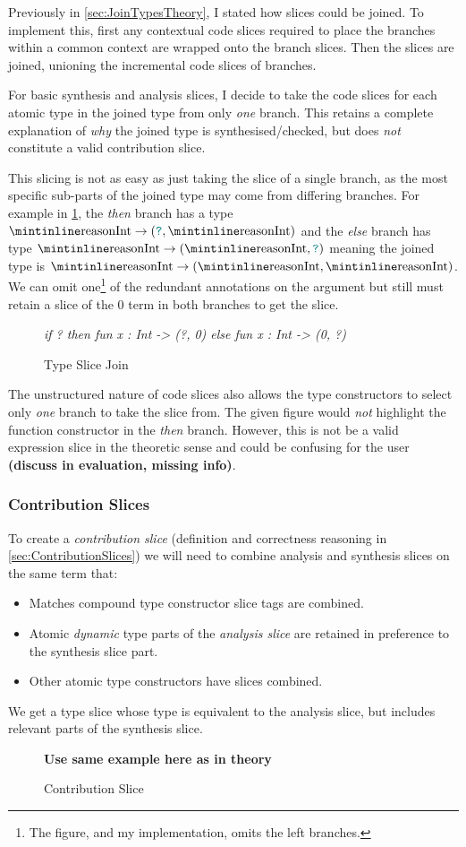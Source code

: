 Previously in \cref{sec:JoinTypesTheory}, I stated how slices could be joined. To implement this, first any contextual code slices required to place the branches within a common context are wrapped onto the branch slices. Then the slices are joined, unioning the incremental code slices of branches.

For basic synthesis and analysis slices, I decide to take the code slices for each atomic type in the joined type from only \textit{one} branch. This retains a complete explanation of \textit{why} the joined type is synthesised/checked, but does \textit{not} constitute a valid contribution slice.

This slicing is not as easy as just taking the slice of a single branch, as the most specific sub-parts of the joined type may come from differing branches. For example in \cref{fig:TypeSliceJoinExample}, the \textit{then} branch has a type $\code{Int} \to (\dyn,\code{Int})$ and the \textit{else} branch has type $\code{Int} \to (\code{Int}, \dyn)$ meaning the joined type is $\code{Int} \to (\code{Int}, \code{Int})$. We can omit one\footnote{The figure, and my implementation, omits the left branches.} of the redundant annotations on the argument but still must retain a slice of the 0 term in both branches to get the  slice.
\begin{figure}[h]
\textit{if ? then fun x : Int -> (?, 0) else fun x : Int -> (0, ?)}
\caption{Type Slice Join}
\label{fig:TypeSliceJoinExample}
\end{figure}

The unstructured nature of code slices also allows the type constructors to select only \textit{one} branch to take the slice from. The given figure would \textit{not} highlight the function constructor in the \textit{then} branch. However, this is not be a valid expression slice in the theoretic sense and could be confusing for the user \textbf{(discuss in evaluation, missing info)}.

\subsubsection{Contribution Slices}
\label{sec:ContributionSliceImplementation}
To create a \textit{contribution slice} (definition and correctness reasoning in \cref{sec:ContributionSlices}) we will need to combine analysis and synthesis slices on the same term that:
\begin{itemize}
\item Matches compound type constructor slice tags are combined.
\item Atomic \textit{dynamic} type parts of the \textit{analysis slice} are retained in preference to the synthesis slice part. 
\item Other atomic type constructors have slices combined.
\end{itemize} 
We get a type slice whose type is equivalent to the analysis slice, but includes relevant parts of the synthesis slice.
\begin{figure}[h]
\textbf{Use same example here as in theory}
\caption{Contribution Slice}
\label{fig:ContributionSliceExample}
\end{figure}

